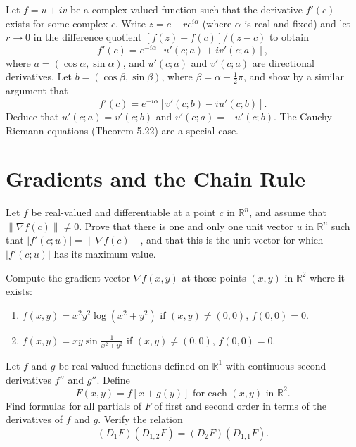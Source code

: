 \begin{problembox}
Let \( f = u + iv \) be a complex-valued function such that the derivative \( f'(c) \) exists for some complex \( c \). Write \( z = c + re^{i\alpha} \) (where \( \alpha \) is real and fixed) and let \( r \to 0 \) in the difference quotient \( [f(z) - f(c)]/(z - c) \) to obtain
\[f'(c) = e^{-i\alpha}[u'(c; a) + iv'(c; a)],\]
where \( a = (\cos \alpha, \sin \alpha) \), and \( u'(c; a) \) and \( v'(c; a) \) are directional derivatives. Let \( b = (\cos \beta, \sin \beta) \), where \( \beta = \alpha + \frac{1}{2}\pi \), and show by a similar argument that
\[f'(c) = e^{-i\alpha}[v'(c; b) - iu'(c; b)].\]
Deduce that \( u'(c; a) = v'(c; b) \) and \( v'(c; a) = -u'(c; b) \). The Cauchy-Riemann equations (Theorem 5.22) are a special case.
\end{problembox}


\section{Gradients and the Chain Rule}

\begin{problembox}
Let \( f \) be real-valued and differentiable at a point \( c \) in \( \mathbb{R}^n \), and assume that \( \| \nabla f(c) \| \neq 0 \). Prove that there is one and only one unit vector \( u \) in \( \mathbb{R}^n \) such that \( |f'(c; u)| = \| \nabla f(c) \| \), and that this is the unit vector for which \( |f'(c; u)| \) has its maximum value.
\end{problembox}

\begin{problembox}
Compute the gradient vector \( \nabla f(x, y) \) at those points \( (x, y) \) in \( \mathbb{R}^2 \) where it exists:
\begin{enumerate}[label=(\alph*)]
\item \( f(x, y) = x^2 y^2 \log (x^2 + y^2) \) if \( (x, y) \ne (0, 0) \), \( f(0, 0) = 0 \).
\item \( f(x, y) = xy \sin \frac{1}{x^2 + y^2} \) if \( (x, y) \ne (0, 0) \), \( f(0, 0) = 0 \).
\end{enumerate}
\end{problembox}

\begin{problembox}
Let \( f \) and \( g \) be real-valued functions defined on \( \mathbb{R}^1 \) with continuous second derivatives \( f'' \) and \( g'' \). Define
\[F(x, y) = f[x + g(y)] \text{ for each } (x, y) \text{ in } \mathbb{R}^2.\]
Find formulas for all partials of \( F \) of first and second order in terms of the derivatives of \( f \) and \( g \). Verify the relation
\[(D_1F)(D_{1,2}F) = (D_2F)(D_{1,1}F).\]
\end{problembox}

